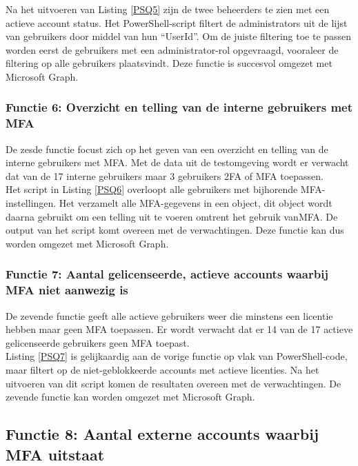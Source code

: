 Na het uitvoeren van Listing \ref{PSQ5} zijn de twee beheerders te zien met een actieve account status. Het PowerShell-script filtert de administrators uit de lijst van gebruikers door middel van hun “UserId”. Om de juiste filtering toe te passen worden eerst de gebruikers met een administrator-rol opgevraagd, vooraleer de filtering op alle gebruikers plaatsvindt. Deze functie is succesvol omgezet met Microsoft Graph.

\subsubsection{Functie 6: Overzicht en telling van de interne gebruikers met MFA}

De zesde functie focust zich op het geven van een overzicht en telling van de interne gebruikers met \ac{MFA}. Met de data uit de testomgeving wordt er verwacht dat van de 17 interne gebruikers maar 3 gebruikers \ac{2FA} of \ac{MFA} toepassen. \\

Het script in Listing \ref{PSQ6} overloopt alle gebruikers met bijhorende \ac{MFA}-instellingen. Het verzamelt alle \ac{MFA}-gegevens in een object, dit object wordt daarna gebruikt om een telling uit te voeren omtrent het gebruik van\ac{MFA}. De output van het script komt overeen met de verwachtingen. Deze functie kan dus worden omgezet met Microsoft Graph. 

\subsubsection{Functie 7: Aantal gelicenseerde, actieve accounts waarbij MFA niet aanwezig is}

De zevende functie geeft alle actieve gebruikers weer die minstens een licentie hebben maar geen \ac{MFA} toepassen. Er wordt verwacht dat er 14 van de 17 actieve gelicenseerde gebruikers geen \ac{MFA} toepast. \\

Listing \ref{PSQ7} is gelijkaardig aan de vorige functie op vlak van PowerShell-code, maar filtert op de niet-geblokkeerde accounts met actieve licenties. Na het uitvoeren van dit script komen de resultaten overeen met de verwachtingen. De zevende functie kan worden omgezet met Microsoft Graph.

\subsection{Functie 8: Aantal externe accounts waarbij MFA uitstaat}

